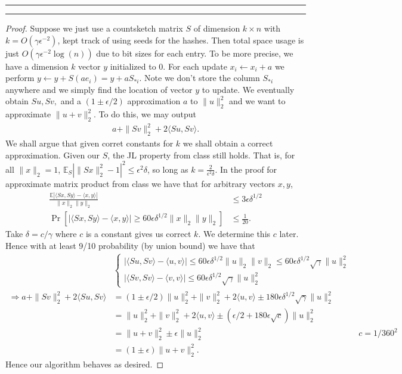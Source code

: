 \documentclass[11pt]{article}
\newcommand{\question}[1] {\vspace{.3in} \hrule\vspace{0.3em}
\noindent{\bf #1} \vspace{0.7em}
\hrule \vspace{.10in}}
\begin{document}
\newpage
\question{Task 2}
\begin{proof}
Suppose we just use a countsketch matrix $S$ of dimension $k \times n$ with $k = O(\gamma \epsilon^{-2})$, kept track of using seeds for the hashes. Then total space usage is just $O(\gamma \epsilon^{-2} \log(n))$ due to bit sizes for each entry. To be more precise, we have a dimension $k$ vector $y$ initialized to 0. For each update $x_i \leftarrow x_i + a$ we perform $y \leftarrow y + S(ae_i) = y + aS_{*i}$. Note we don't store the column $S_{*i}$ anywhere and we simply find the location of vector $y$ to update. We eventually obtain $Su, Sv,$ and a $(1 \pm \epsilon/2)$ approximation $a$ to $\|u\|_2^2$ and we want to approximate $\|u + v\|_2^2$. To do this, we may output
\begin{align*}
  a + \|Sv\|_2^2 + 2\langle Su, Sv \rangle.
\end{align*}
We shall argue that given corret constants for $k$ we shall obtain a correct approximation. Given our $S$, the JL property from class still holds. That is, for all $\|x\|_2 = 1$, $\mathbb{E}_S\left|\|Sx\|_2^2 - 1\right|^2 \le \epsilon^2 \delta$, so long as $k = \frac{2}{\epsilon^2 \delta}$. In the proof for approximate matrix product from class we have that for arbitrary vectors $x,y$,
\begin{align*}
  \frac{\mathbb{E}|\langle Sx, Sy \rangle - \langle x, y \rangle|}{\|x\|_2 \|y\|_2} &\le 3 \epsilon \delta^{1/2}\\
  \Pr[|\langle Sx, Sy \rangle - \langle x, y \rangle| \ge 60\epsilon \delta^{1/2} \|x\|_2 \|y\|_2] &\le \frac{1}{20}.
\end{align*}
Take $\delta = c/\gamma$ where $c$ is a constant gives us correct $k$. We determine this $c$ later. Hence with at least 9/10 probability (by union bound) we have that
\begin{align*}
  &\begin{cases}
  |\langle Su, Sv \rangle - \langle u, v \rangle| \le 60 \epsilon \delta^{1/2} \|u\|_2\|v\|_2 \le 60 \epsilon \delta^{1/2} \sqrt{\gamma} \|u\|_2^2\\
  |\langle Sv, Sv \rangle - \langle v, v \rangle| \le 60 \epsilon \delta^{1/2} \sqrt{\gamma} \|u\|_2^2
  \end{cases}\\
  \Rightarrow a + \|Sv\|_2^2 + 2\langle Su, Sv \rangle &= (1 \pm \epsilon/2) \|u\|_2^2 + \|v\|_2^2 + 2\langle u, v\rangle \pm 180\epsilon \delta^{1/2} \sqrt{\gamma} \|u\|_2^2\\
  &= \|u\|_2^2 + \|v\|_2^2 + 2\langle u, v\rangle \pm (\epsilon/2 + 180\epsilon \sqrt{c}) \|u\|_2^2\\
  &= \|u + v\|_2^2 \pm \epsilon\|u\|_2^2 &c = 1/360^2\\
  &= (1 \pm \epsilon)\|u + v\|_2^2.
\end{align*}
Hence our algorithm behaves as desired.
\end{proof}
\end{document}
